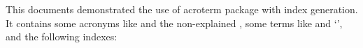 \documentclass{article}
\begin{document}
\noindent
This documents demonstrated the use of acroterm package with index generation.
It contains some acronyms like  and the
non-explained , some terms like 
and `', and the following indexes:

\printsubindex[idx]
\printsubindex[acronym]
\end{document}
